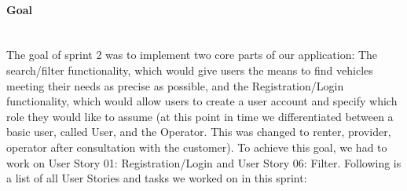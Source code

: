 \paragraph{Goal} \\
The goal of sprint 2 was to implement two core parts of our application: The search/filter functionality, which would give users the means to find vehicles meeting their needs as precise as possible, and the Registration/Login functionality, which would allow users to create a user account and specify which role they would like to assume (at this point in time we differentiated between a basic user, called User, and the Operator. This was changed to renter, provider, operator after consultation with the customer). To achieve this goal, we had to work on User Story 01: Registration/Login and User Story 06: Filter. Following is a list of all User Stories and tasks we worked on in this sprint: \\

